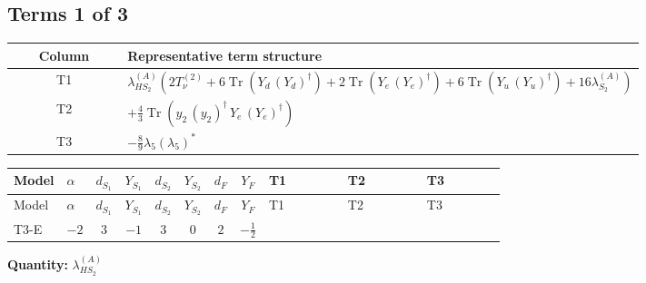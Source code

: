 \documentclass[8pt]{article}
\begin{document}
\begin{landscape}
\subsection*{Terms 1 of 3}
\begin{center}
\begin{tabular}{@{}c >{\raggedright\arraybackslash}p{0.82\linewidth}@{}}
\toprule
Column & Representative term structure \\
\midrule
T1 & \(\displaystyle {\lambda_{HS_2}^{(A)}} (2 T_{\nu}^{(2)}+6 \operatorname{Tr}\!\left({Y_d}\,\left({Y_d}\right)^{\dagger}\right)+2 \operatorname{Tr}\!\left({Y_e}\,\left({Y_e}\right)^{\dagger}\right)+6 \operatorname{Tr}\!\left({Y_u}\,\left({Y_u}\right)^{\dagger}\right)+16 {\lambda_{S_2}^{(A)}})\) \\
\midrule
T2 & \(\displaystyle +\frac{4}{3} \operatorname{Tr}\!\left({y_2}\,\left({y_2}\right)^{\dagger}\,{Y_e}\,\left({Y_e}\right)^{\dagger}\right)\) \\
\midrule
T3 & \(\displaystyle -\frac{8}{9} {\lambda_5} \left({\lambda_5}\right)^{*}\) \\
\midrule
\bottomrule
\end{tabular}
\end{center}
\smallskip
\tiny
\begin{longtable}{@{}llcccccc >{\raggedright\arraybackslash}p{0.21\linewidth} >{\raggedright\arraybackslash}p{0.21\linewidth} >{\raggedright\arraybackslash}p{0.21\linewidth}@{}}
\toprule
Model & $\alpha$ & $d_{S_1}$ & $Y_{S_1}$ & $d_{S_2}$ & $Y_{S_2}$ & $d_F$ & $Y_F$ & T1 & T2 & T3 \\
\midrule
\endfirsthead
\toprule
Model & $\alpha$ & $d_{S_1}$ & $Y_{S_1}$ & $d_{S_2}$ & $Y_{S_2}$ & $d_F$ & $Y_F$ & T1 & T2 & T3 \\
\midrule
\endhead
T3-E & $-2$ & $3$ & $-1$ & $3$ & $0$ & $2$ & $-\frac{1}{2}$ & \scriptsize\adjustbox{max width=\linewidth}{$\begin{gathered} {\lambda_{HS_2}^{(A)}} (2 T_{\nu}^{(2)}+6 \operatorname{Tr}\!\left({Y_d}\,\left({Y_d}\right)^{\dagger}\right)+2 \operatorname{Tr}\!\left({Y_e}\,\left({Y_e}\right)^{\dagger}\right)+6 \operatorname{Tr}\!\left({Y_u}\,\left({Y_u}\right)^{\dagger}\right)+16 {\lambda_{S_2}^{(A)}})\end{gathered}$} & \scriptsize\adjustbox{max width=\linewidth}{$\begin{gathered} +\frac{4}{3} \operatorname{Tr}\!\left({y_2}\,\left({y_2}\right)^{\dagger}\,{Y_e}\,\left({Y_e}\right)^{\dagger}\right)\end{gathered}$} & \scriptsize\adjustbox{max width=\linewidth}{$\begin{gathered} -\frac{8}{9} {\lambda_5} \left({\lambda_5}\right)^{*}\end{gathered}$} \\
\midrule
\bottomrule
\end{longtable}
\clearpage
\noindent\textbf{Quantity: }$\lambda_{HS_2}^{(A)}$\par\smallskip

\end{landscape}
\end{document}
